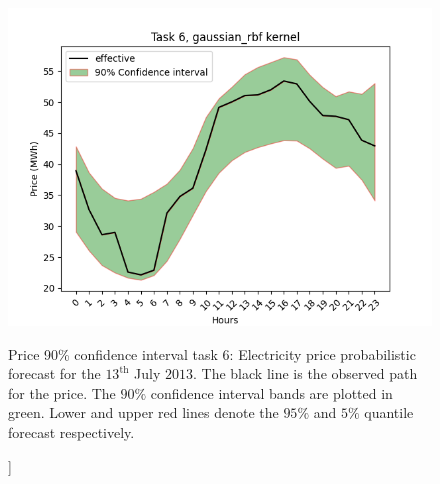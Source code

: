 \begin{figure}[!ht]
    \centering
    \includegraphics[width=\linewidth]{images/price_task_6_gaussian_rbf.png}
    \caption[[Prediction price track task 6, Gaussian RBF kernel]]{Price 90\% confidence interval task 6: \small \textmd{Electricity price probabilistic forecast for the $13^{\text{th}}$ July $2013$. The black line is the observed path for the price. The $90\%$ confidence interval bands are plotted in green. Lower and upper red lines denote the $95\%$ and $5\%$ quantile forecast respectively.}}
    \label{fig:price_task_6_gaussian_rbf}
\end{figure}



